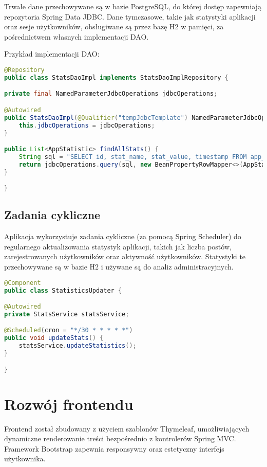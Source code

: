 Trwałe dane przechowywane są w bazie PostgreSQL, do której dostęp zapewniają repozytoria Spring Data JDBC. Dane tymczasowe, takie jak statystyki aplikacji oraz sesje użytkowników, obsługiwane są przez bazę H2 w pamięci, za pośrednictwem własnych implementacji DAO.

Przykład implementacji DAO:

\begin{lstlisting}[language=Java]
@Repository
public class StatsDaoImpl implements StatsDaoImplRepository {

private final NamedParameterJdbcOperations jdbcOperations;

@Autowired
public StatsDaoImpl(@Qualifier("tempJdbcTemplate") NamedParameterJdbcOperations jdbcOperations) {
    this.jdbcOperations = jdbcOperations;
}

public List<AppStatistic> findAllStats() {
    String sql = "SELECT id, stat_name, stat_value, timestamp FROM app_statistics";
    return jdbcOperations.query(sql, new BeanPropertyRowMapper<>(AppStatistic.class));
}

}
\end{lstlisting}

\subsection{Zadania cykliczne}

Aplikacja wykorzystuje zadania cykliczne (za pomocą Spring Scheduler) do regularnego aktualizowania statystyk aplikacji, takich jak liczba postów, zarejestrowanych użytkowników oraz aktywność użytkowników. Statystyki te przechowywane są w bazie H2 i używane są do analiz administracyjnych.

\begin{lstlisting}[language=Java]
@Component
public class StatisticsUpdater {

@Autowired
private StatsService statsService;

@Scheduled(cron = "*/30 * * * * *")
public void updateStats() {
    statsService.updateStatistics();
}

}
\end{lstlisting}

\section{Rozwój frontendu}

Frontend został zbudowany z użyciem szablonów Thymeleaf, umożliwiających dynamiczne renderowanie treści bezpośrednio z kontrolerów Spring MVC. Framework Bootstrap zapewnia responsywny oraz estetyczny interfejs użytkownika.

